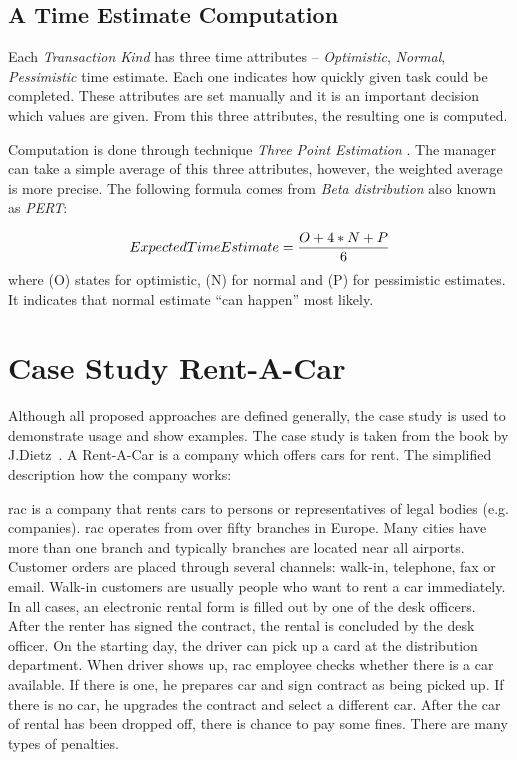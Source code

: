 \subsection{A Time Estimate Computation}
Each \textit{Transaction Kind} has three time attributes -- \textit{Optimistic}, \textit{Normal}, \textit{Pessimistic} time estimate. Each one indicates how quickly given task could be completed. These attributes are set manually and it is an important decision which values are given. From this three attributes, the resulting one is computed.  

Computation is done through technique \textit{Three Point Estimation} \cite{beta-distribution}. 
The manager can take a simple average of this three attributes, however, the weighted average is more precise.
The following formula comes from \textit{Beta distribution} also known as \textit{PERT}:

\begin{displaymath}
\centering
ExpectedTimeEstimate = \frac{O + 4*N + P}{6}
\end{displaymath}
where (O) states for optimistic, (N) for normal and (P) for pessimistic estimates. It indicates that normal estimate ``can happen'' most likely.
\section{Case Study Rent-A-Car}
Although all proposed approaches are defined generally, the case study is used to demonstrate usage and show examples. The case study is taken from the book by J.Dietz~\cite{dietz-essence-2015}. A Rent-A-Car is a company which offers cars for rent. The simplified description how the company works:

\gls{rac} is a company that rents cars to persons or representatives of legal bodies (e.g. companies). \gls{rac} operates from over fifty branches in Europe. Many cities have more than one branch and typically branches are located near all airports. 
Customer orders are placed through several channels: walk-in, telephone, fax or email. Walk-in customers are usually people who want to rent a car immediately. In all cases, an electronic rental form is filled out by one of the desk officers. 
After the renter has signed the contract, the rental is concluded by the desk officer. On the starting day, the driver can pick up a card at the distribution department. When driver shows up, \gls{rac} employee checks whether there is a car available. If there is one, he prepares car and sign contract as being picked up. If there is no car, he upgrades the contract and select a different car. 
After the car of rental has been dropped off, there is chance to pay some fines. There are many types of penalties.

